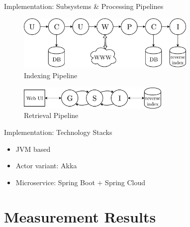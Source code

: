 \documentclass{beamer}
\begin{document}
\begin{frame}{Implementation: Subsystems \& Processing Pipelines}

\begin{figure} 
  \includegraphics[width=0.77\textwidth]{graphics/pipeline-indexing.png} 
  \caption{Indexing Pipeline}
\end{figure}

\begin{figure} 
  \includegraphics[width=0.65\textwidth]{graphics/pipeline-retrieval.png} 
  \caption{Retrieval Pipeline}
\end{figure}

\end{frame}


\begin{frame}{Implementation: Technology Stacks}

\begin{itemize}
  \item JVM based
  \item Actor variant: Akka
  \item Microservice: Spring Boot $+$ Spring Cloud
\end{itemize}

\end{frame}


\section{Measurement Results}

\end{document}

